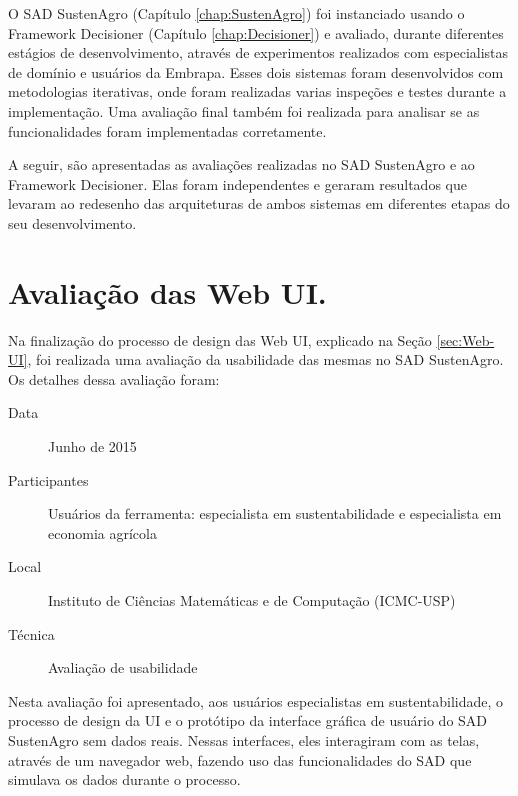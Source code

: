 O SAD SustenAgro (Capítulo \ref{chap:SustenAgro}) foi instanciado
usando o Framework Decisioner (Capítulo \ref{chap:Decisioner}) e
avaliado, durante diferentes estágios de desenvolvimento, através
de experimentos realizados com especialistas de domínio e usuários
da Embrapa. Esses dois sistemas foram desenvolvidos com metodologias
iterativas, onde foram realizadas varias inspeções e testes durante
a implementação. Uma avaliação final também foi realizada para analisar
se as funcionalidades foram implementadas corretamente.

A seguir, são apresentadas as avaliações realizadas no SAD SustenAgro
e ao Framework Decisioner. Elas foram independentes e geraram resultados
que levaram ao redesenho das arquiteturas de ambos sistemas em diferentes
etapas do seu desenvolvimento.

\section{Avaliação das Web UI.}

Na finalização do processo de design das Web UI, explicado na Seção
\ref{sec:Web-UI}, foi realizada uma avaliação da usabilidade das
mesmas no SAD SustenAgro. Os detalhes dessa avaliação foram:
\begin{description}
\item [{Data}] Junho de 2015
\item [{Participantes}] Usuários da ferramenta: especialista em sustentabilidade
e especialista em economia agrícola
\item [{Local}] Instituto de Ciências Matemáticas e de Computação (ICMC-USP) 
\item [{Técnica}] Avaliação de usabilidade
\end{description}
Nesta avaliação foi apresentado, aos usuários especialistas em sustentabilidade,
o processo de design da UI e o protótipo da interface gráfica de usuário
do SAD SustenAgro sem dados reais. Nessas interfaces, eles interagiram
com as telas, através de um navegador web, fazendo uso das funcionalidades
do SAD que simulava os dados durante o processo.

